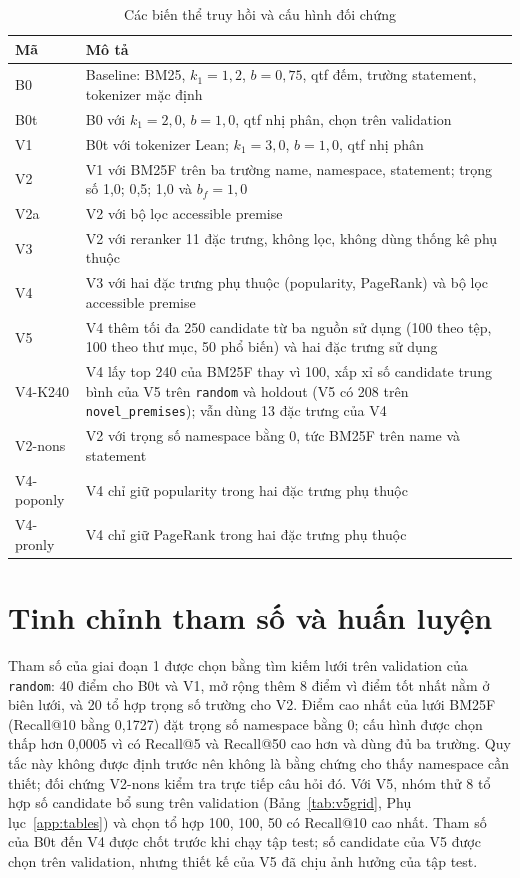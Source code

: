 \documentclass[11pt,a4paper,oneside]{report}
\newcommand{\code}[1]{\texttt{#1}}
\begin{document}
\begin{table}[htbp]
\centering
\caption{Các biến thể truy hồi và cấu hình đối chứng}\label{tab:variants}
\begin{tabularx}{\linewidth}{@{}lX@{}}
\toprule
Mã & Mô tả \\
\midrule
B0 & Baseline: BM25, $k_1 = 1{,}2$, $b = 0{,}75$, qtf đếm, trường statement, tokenizer mặc định \\
B0t & B0 với $k_1 = 2{,}0$, $b = 1{,}0$, qtf nhị phân, chọn trên validation \\
V1 & B0t với tokenizer Lean; $k_1 = 3{,}0$, $b = 1{,}0$, qtf nhị phân \\
V2 & V1 với BM25F trên ba trường name, namespace, statement; trọng số 1,0; 0,5; 1,0 và $b_f = 1{,}0$ \\
V2a & V2 với bộ lọc accessible premise \\
V3 & V2 với reranker 11 đặc trưng, không lọc, không dùng thống kê phụ thuộc \\
V4 & V3 với hai đặc trưng phụ thuộc (popularity, PageRank) và bộ lọc accessible premise \\
V5 & V4 thêm tối đa 250 candidate từ ba nguồn sử dụng (100 theo tệp, 100 theo thư mục, 50 phổ biến) và hai đặc trưng sử dụng \\
\midrule
V4-K240 & V4 lấy top 240 của BM25F thay vì 100, xấp xỉ số candidate trung bình của V5 trên \code{random} và holdout (V5 có 208 trên \code{novel\_premises}); vẫn dùng 13 đặc trưng của V4 \\
V2-nons & V2 với trọng số namespace bằng 0, tức BM25F trên name và statement \\
V4-poponly & V4 chỉ giữ popularity trong hai đặc trưng phụ thuộc \\
V4-pronly & V4 chỉ giữ PageRank trong hai đặc trưng phụ thuộc \\
\bottomrule
\end{tabularx}
\end{table}

\section{Tinh chỉnh tham số và huấn luyện}\label{sec:tuning}

Tham số của giai đoạn 1 được chọn bằng tìm kiếm lưới trên validation của \code{random}: 40 điểm cho B0t và V1, mở rộng thêm
8 điểm vì điểm tốt nhất nằm ở biên lưới, và 20 tổ hợp trọng số trường cho V2. Điểm cao nhất của lưới BM25F (Recall@10 bằng
0,1727) đặt trọng số namespace bằng 0; cấu hình được chọn thấp hơn 0,0005 vì có Recall@5 và Recall@50 cao hơn và dùng đủ ba
trường. Quy tắc này không được định trước nên không là bằng chứng cho thấy namespace cần thiết; đối chứng V2-nons kiểm tra
trực tiếp câu hỏi đó. Với V5, nhóm thử 8 tổ hợp số candidate bổ sung trên validation (Bảng~\ref{tab:v5grid},
Phụ lục~\ref{app:tables}) và chọn tổ hợp 100, 100, 50 có Recall@10 cao nhất. Tham số của B0t đến V4 được chốt trước khi chạy
tập test; số candidate của V5 được chọn trên validation, nhưng thiết kế của V5 đã chịu ảnh hưởng của tập test.
\end{document}
